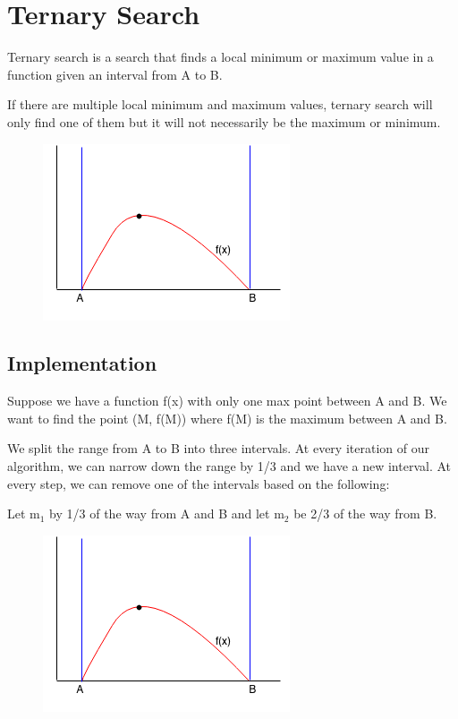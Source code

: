 \documentclass[11pt,oneside]{book}
\makeatletter
\def\maxwidth#1{\ifdim\Gin@nat@width>#1 #1\else\Gin@nat@width\fi}
\makeatother
\begin{document}
        \section{ Ternary Search }
        

Ternary search is a search that finds a local minimum or maximum value in a function given an interval from A to B.

If there are multiple local minimum and maximum values, ternary search will only find one of them but it will not necessarily be the maximum or minimum.

\vspace{5px}\begin{figure}[H]\centering
        \includegraphics[width=0.66\maxwidth{\textwidth}]{ternarysearch.png}
        \end{figure}

\subsection{Implementation}

Suppose we have a function f(x) with only one max point between A and B. We want to find the point (M, f(M)) where f(M) is the maximum between A and B.

We split the range from A to B into three intervals. At every iteration of our algorithm, we can narrow down the range by 1/3 and we have a new interval. At every step, we can remove one of the intervals based on the following:

Let m$_{1}$ by 1/3 of the way from A and B and let m$_{2}$ be 2/3 of the way from B.

\vspace{5px}\begin{figure}[H]\centering
        \includegraphics[width=0.66\maxwidth{\textwidth}]{ternarysearch.png}
        \end{figure}
\end{document}
